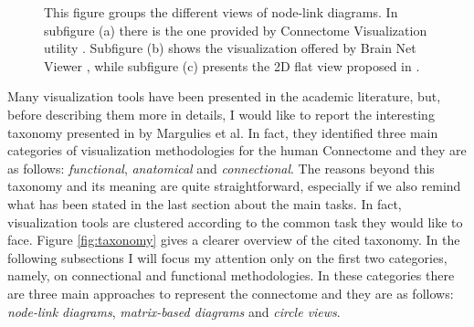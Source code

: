 \documentclass{article}
\begin{document}
\begin{multicols}{2}
\begin{figure}[ht]
	\caption{This figure groups the different views of node-link diagrams. In subfigure (a) there is the one provided by Connectome Visualization utility \cite{connectomeVisualizationUtility}. Subfigure (b) shows the visualization offered by Brain Net Viewer \cite{brainNetViewer}, while subfigure (c) presents the 2D flat view proposed in \cite{salvador2005undirected}.}
\end{figure}


Many visualization tools have been presented in the academic literature, but, before describing them more in details, I would like to report the interesting taxonomy presented in \cite{visualizingHumanConnectome} by Margulies et al. In fact, they identified three main categories of visualization methodologies for the human Connectome and they are as follows: \textit{functional}, \textit{anatomical} and \textit{connectional}. The reasons beyond this taxonomy and its meaning are quite straightforward, especially if we also remind what has been stated in the last section about the main tasks. In fact, visualization tools are clustered according to the common task they would like to face. Figure \ref{fig:taxonomy} gives a clearer overview of the cited taxonomy. In the following subsections I will focus my attention only on the first two categories, namely, on connectional and functional methodologies. In these categories there are three main approaches to represent the connectome and they are as follows: \textit{node-link diagrams}, \textit{matrix-based diagrams} and \textit{circle views}.



\end{multicols}
\end{document}

